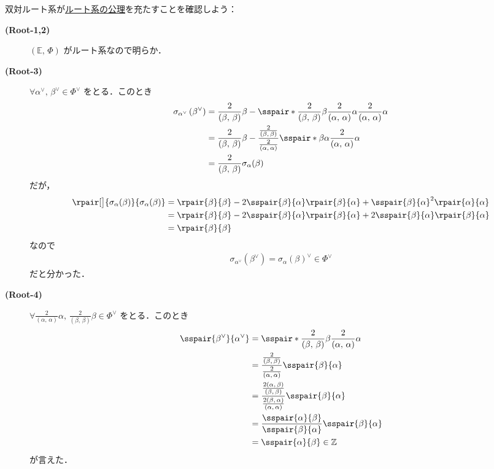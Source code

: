 \documentclass[rep_main]{subfiles}
\begin{document}
双対ルート系が\hyperref[ax:root-system]{ルート系の公理}を充たすことを確認しよう：
\begin{description}
	\item[\textbf{(Root-1,2)}] $(\mathbb{E},\, \Phi)$ がルート系なので明らか．
	\item[\textbf{(Root-3)}] $\forall \alpha^\vee,\, \beta^\vee \in \Phi^\vee$ をとる．このとき
	\begin{align}
		\label{eq:dual-root3}
		\sigma_{\alpha^\vee} \left( \beta^\vee  \right) 
		&= \frac{2}{(\beta,\, \beta)} \beta - \sspair*{\frac{2}{(\beta,\, \beta)} \beta}{\frac{2}{(\alpha,\, \alpha)} \alpha } \frac{2}{(\alpha,\, \alpha)} \alpha \\
		&= \frac{2}{(\beta,\, \beta)} \beta - \frac{\frac{2}{(\beta,\, \beta)}}{\frac{2}{(\alpha,\, \alpha)}} \sspair*{\beta}{\alpha} \frac{2}{(\alpha,\, \alpha)} \alpha \\
		&= \frac{2}{(\beta,\, \beta)} \sigma_{\alpha}(\beta)
	\end{align}
	だが，
	\begin{align}
		\rpair[\big]{\sigma_\alpha(\beta)}{\sigma_\alpha(\beta)}
		&= \rpair{\beta}{\beta} - 2 \sspair{\beta}{\alpha} \rpair{\beta}{\alpha} + \sspair{\beta}{\alpha}^2 \rpair{\alpha}{\alpha} \\
		&= \rpair{\beta}{\beta} - 2 \sspair{\beta}{\alpha} \rpair{\beta}{\alpha} + 2\sspair{\beta}{\alpha}\rpair{\beta}{\alpha} \\
		&= \rpair{\beta}{\beta}
	\end{align}
	なので
	\begin{align}
		\sigma_{\alpha^\vee} \left( \beta^\vee  \right) = \sigma_\alpha(\beta)^\vee \in \Phi^\vee
	\end{align}
	だと分かった．
	\item[\textbf{(Root-4)}] $\forall \frac{2}{(\alpha,\, \alpha)} \alpha,\, \frac{2}{(\beta,\, \beta)} \beta \in \Phi^\vee$ をとる．このとき
	\begin{align}
		\sspair{\beta^\vee}{\alpha^\vee}
		&= \sspair*{\frac{2}{(\beta,\, \beta)} \beta}{\frac{2}{(\alpha,\, \alpha)} \alpha} \\
		&= \frac{\frac{2}{(\beta,\, \beta)}}{\frac{2}{(\alpha,\, \alpha)}} \sspair{\beta}{\alpha} \\
		&= \frac{\frac{2(\alpha,\, \beta)}{(\beta,\, \beta)}}{\frac{2(\beta,\, \alpha)}{(\alpha,\, \alpha)}} \sspair{\beta}{\alpha} \\
		&= \frac{\sspair{\alpha}{\beta}}{\sspair{\beta}{\alpha}} \sspair{\beta}{\alpha} \\
		&= \sspair{\alpha}{\beta} \in \mathbb{Z}
	\end{align}
	が言えた．
\end{description}
\end{document}
